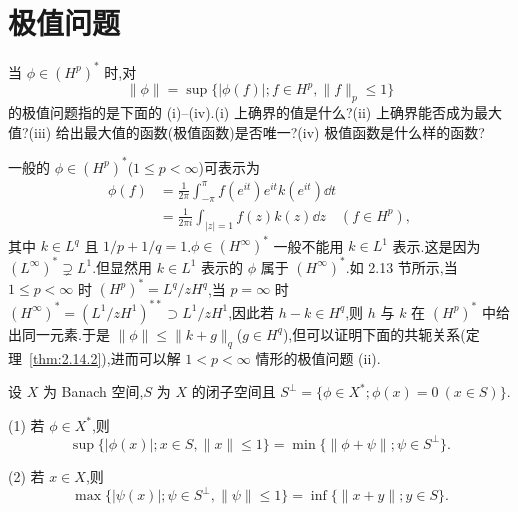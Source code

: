 \section{极值问题}\label{sec:2.14}


当 $\phi \in (H^{p})^{*}$ 时,对
\begin{equation*}
\|\phi\| = \sup \{|\phi(f)|; f \in H^{p}, \|f\|_{p} \leq 1\}
\end{equation*}
的极值问题指的是下面的 (i)--(iv).(i) 上确界的值是什么?(ii) 上确界能否成为最大值?(iii) 给出最大值的函数(极值函数)是否唯一?(iv) 极值函数是什么样的函数?

一般的 $\phi \in (H^{p})^{*}$($1 \leq p < \infty$)可表示为
\begin{align*}
\phi(f) & = \frac{1}{2\pi}\int_{-\pi}^{\pi} f(e^{it}) e^{it} k(e^{it})\dd t \\
& = \frac{1}{2\pi i}\int_{|z|=1} f(z) k(z)\dd z \quad (f \in H^{p}),
\end{align*}
其中 $k \in L^{q}$ 且 $1/p + 1/q = 1$.$\phi \in (H^{\infty})^{*}$ 一般不能用 $k \in L^{1}$ 表示.这是因为 $(L^{\infty})^{*} \supsetneq L^{1}$.但显然用 $k \in L^{1}$ 表示的 $\phi$ 属于 $(H^{\infty})^{*}$.如 2.13 节所示,当 $1 \leq p < \infty$ 时 $(H^{p})^{*} = L^{q}/zH^{q}$,当 $p = \infty$ 时 $(H^{\infty})^{*} = (L^{1}/zH^{1})^{**} \supset L^{1}/zH^{1}$,因此若 $h - k \in H^{q}$,则 $h$ 与 $k$ 在 $(H^{p})^{*}$ 中给出同一元素.于是 $\|\phi\| \leq \|k + g\|_{q}$($g \in H^{q}$),但可以证明下面的共轭关系(定理~\ref{thm:2.14.2}),进而可以解 $1 < p < \infty$ 情形的极值问题 (ii).

\begin{lemma}\label{lem:2.14.1}
设 $X$ 为 Banach 空间,$S$ 为 $X$ 的闭子空间且 $S^{\perp} = \{\phi \in X^{*}; \phi(x) = 0 \ (x \in S)\}$.

(1) 若 $\phi \in X^{*}$,则
\begin{equation*}
\sup \{|\phi(x)|; x \in S, \|x\| \leq 1\} = \min \{\|\phi + \psi\|; \psi \in S^{\perp}\}.
\end{equation*}

(2) 若 $x \in X$,则
\begin{equation*}
\max \{|\psi(x)|; \psi \in S^{\perp}, \|\psi\| \leq 1\} = \inf \{\|x + y\|; y \in S\}.
\end{equation*}
\end{lemma}

